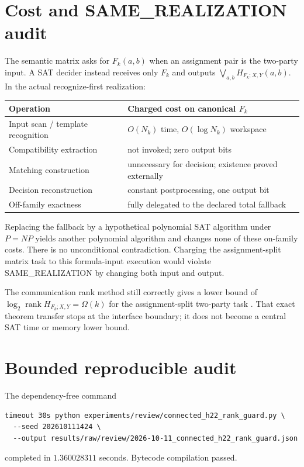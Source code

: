 \documentclass[11pt]{article}
\begin{document}
\section{Cost and SAME\_REALIZATION audit}

The semantic matrix asks for $F_k(a,b)$ when an assignment pair is the
two-party input.  A SAT decider instead receives only $F_k$ and outputs
$\bigvee_{a,b}H_{F_k;X,Y}(a,b)$.  In the actual recognize-first realization:
\begin{center}
\begin{tabular}{@{}ll@{}}
\toprule
Operation & Charged cost on canonical $F_k$\\
\midrule
Input scan / template recognition & $O(N_k)$ time, $O(\log N_k)$ workspace\\
Compatibility extraction & not invoked; zero output bits\\
Matching construction & unnecessary for decision; existence proved externally\\
Decision reconstruction & constant postprocessing, one output bit\\
Off-family exactness & fully delegated to the declared total fallback\\
\bottomrule
\end{tabular}
\end{center}
Replacing the fallback by a hypothetical polynomial SAT algorithm under
$P=NP$ yields another polynomial algorithm and changes none of these
on-family costs.  There is no unconditional contradiction.  Charging the
assignment-split matrix task to this formula-input execution would violate
SAME\_REALIZATION by changing both input and output.

The communication rank method still correctly gives a lower bound of
\(\log_2\operatorname{rank}H_{F_k;X,Y}=\Omega(k)\) for the assignment-split
two-party task \cite{mehlhorn}.  That exact theorem transfer stops at the
interface boundary; it does not become a central SAT time or memory lower
bound.

\section{Bounded reproducible audit}

The dependency-free command
\begin{verbatim}
timeout 30s python experiments/review/connected_h22_rank_guard.py \
  --seed 202610111424 \
  --output results/raw/review/2026-10-11_connected_h22_rank_guard.json
\end{verbatim}
completed in $1.360028311$ seconds.  Bytecode compilation passed.
\end{document}
